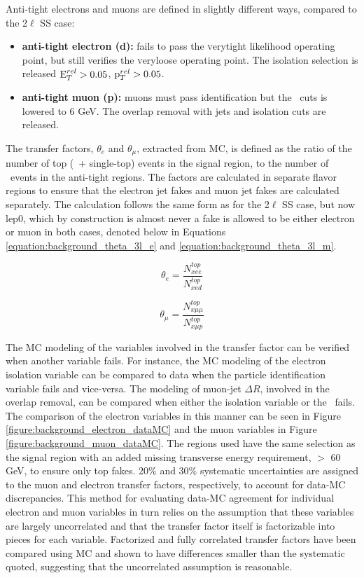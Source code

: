 Anti-tight electrons and muons are defined in slightly different ways, compared to the 2$\ell$ SS case:
\begin{itemize}
\item \textbf{ anti-tight electron (d):} fails to pass the {\textsc verytight} likelihood operating point, but still verifies the {\textsc veryloose} operating point. The isolation selection is released $\rm E_{T}^{rel}>0.05$,  $\rm p_{T}^{rel}>0.05$.

\item \textbf{ anti-tight muon (p):} muons must pass identification but the \pt\ cuts is lowered to 6 GeV. The overlap removal with jets and isolation cuts are released.
\end{itemize} 
The transfer factors, $\theta_e$ and $\theta_{\mu}$, extracted from MC, is defined as the ratio of the number of top (\ttbar\ + single-top) events in the signal region, to the number of \ttbar\ events in the anti-tight regions. The factors are calculated in separate flavor regions to ensure that the electron jet fakes and muon jet fakes are calculated separately. The calculation follows the same form as for the 2$\ell$ SS case, but now lep0, which by construction is almost never a fake is allowed to be either electron or muon in both cases, denoted below in Equations \ref{equation:background_theta_3l_e} and \ref{equation:background_theta_3l_m}.  

\begin{equation}
\theta_e = \frac{N^{top}_{xee}}{N^{top}_{xed}}
\label{equation:background_theta_3l_e}
\end{equation}

\begin{equation}
\theta_{\mu} = \frac{N^{top}_{x\mu\mu}}{N^{top}_{x\mu p}}
\label{equation:background_theta_3l_m}
\end{equation}




The MC modeling of the variables involved in the transfer factor can be verified when another variable fails. For instance, the MC modeling of the electron isolation variable can be compared to data when the particle identification variable fails and vice-versa. The modeling of muon-jet $\Delta R$, involved in the overlap removal, can be compared when either the isolation variable or the \pt\ fails. The comparison of the electron variables in this manner can be seen in Figure \ref{figure:background_electron_dataMC} and the muon variables in Figure \ref{figure:background_muon_dataMC}. The regions used have the same selection as the signal region with an added missing transverse energy requirement, $>$ 60 GeV, to ensure only top fakes. 20\% and 30\% systematic uncertainties are assigned to the muon and electron transfer factors, respectively, to account for data-MC discrepancies. This method for evaluating data-MC agreement for individual electron and muon variables in turn relies on the assumption that these variables are largely uncorrelated and that the transfer factor itself is factorizable into pieces for each variable. Factorized and fully correlated transfer factors have been compared using MC and shown to have differences smaller than the systematic quoted, suggesting that the uncorrelated assumption is reasonable. 


